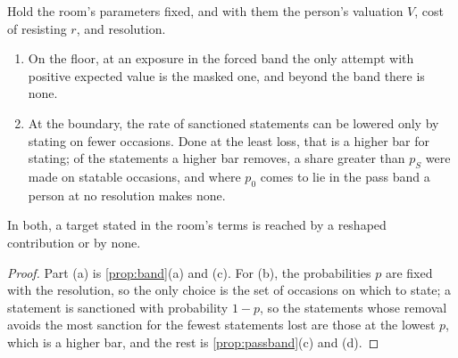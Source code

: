 \begin{corollary}\label{cor:programs}
Hold the room's parameters fixed, and with them the person's valuation $V$, cost of resisting $r$, and resolution.
\begin{enumerate}[label=(\alph*)]
\item On the floor, at an exposure in the forced band the only attempt with positive expected value is the masked one, and beyond the band there is none.
\item At the boundary, the rate of sanctioned statements can be lowered only by stating on fewer occasions. Done at the least loss, that is a higher bar for stating; of the statements a higher bar removes, a share greater than $p_S$ were made on statable occasions, and where $p_0$ comes to lie in the pass band a person at no resolution makes none.
\end{enumerate}
In both, a target stated in the room's terms is reached by a reshaped contribution or by none.
\end{corollary}

\begin{proof}
Part (a) is \autoref{prop:band}(a) and (c). For (b), the probabilities $p$ are fixed with the resolution, so the only choice is the set of occasions on which to state; a statement is sanctioned with probability $1 - p$, so the statements whose removal avoids the most sanction for the fewest statements lost are those at the lowest $p$, which is a higher bar, and the rest is \autoref{prop:passband}(c) and (d).
\end{proof}

